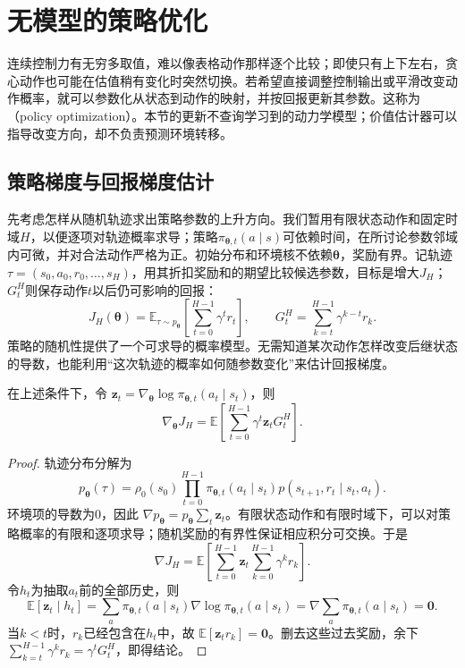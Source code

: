 \section{无模型的策略优化}
\label{sec:rl-learning-policy}

连续控制力有无穷多取值，难以像表格动作那样逐个比较；即使只有上下左右，贪心动作也可能在估值稍有变化时突然切换。若希望直接调整控制输出或平滑改变动作概率，就可以参数化从状态到动作的映射，并按回报更新其参数。这称为（policy optimization）。本节的更新不查询学习到的动力学模型；价值估计器可以指导改变方向，却不负责预测环境转移。

\subsection{策略梯度与回报梯度估计}
\label{sec:rl-learning-policy-gradient}

先考虑怎样从随机轨迹求出策略参数的上升方向。我们暂用有限状态动作和固定时域$H$，以便逐项对轨迹概率求导；策略$\pi_{\bm\theta,t}(a\mid s)$可依赖时间，在所讨论参数邻域内可微，并对合法动作严格为正。初始分布和环境核不依赖$\bm\theta$，奖励有界。记轨迹$\tau=(s_0,a_0,r_0,\ldots,s_H)$，用其折扣奖励和的期望比较候选参数，目标是增大$J_H$；$G_t^H$则保存动作$t$以后仍可影响的回报：
\begin{equation}
  J_H(\bm\theta)=\mathbb E_{\tau\sim p_{\bm\theta}}
      \left[\sum_{t=0}^{H-1}\gamma^t r_t\right],
  \qquad
  G_t^{H}=\sum_{k=t}^{H-1}\gamma^{k-t}r_k .
  \label{eq:rl-learning-finite-policy-objective}
\end{equation}
策略的随机性提供了一个可求导的概率模型。无需知道某次动作怎样改变后继状态的导数，也能利用“这次轨迹的概率如何随参数变化”来估计回报梯度。

\begin{theorem}[有限时域似然比策略梯度]
  \label{thm:rl-learning-likelihood-gradient}
  在上述条件下，令
  $\bm{z}_t=\nabla_{\bm\theta}\log\pi_{\bm\theta,t}(a_t\mid s_t)$，则
  \begin{equation}
    \nabla_{\bm\theta}J_H
       =\mathbb E\left[
          \sum_{t=0}^{H-1}\gamma^t\bm{z}_tG_t^H\right].
    \label{eq:rl-learning-reward-to-go}
  \end{equation}
\end{theorem}
\begin{proof}
  轨迹分布分解为
  \[
    p_{\bm\theta}(\tau)=\rho_0(s_0)
       \prod_{t=0}^{H-1}
       \pi_{\bm\theta,t}(a_t\mid s_t)
       p(s_{t+1},r_t\mid s_t,a_t).
  \]
  环境项的导数为0，因此
  $\nabla p_{\bm\theta}=p_{\bm\theta}\sum_t\bm{z}_t$。有限状态动作和有限时域下，可以对策略概率的有限和逐项求导；随机奖励的有界性保证相应积分可交换。于是
  \[
    \nabla J_H
      =\mathbb E\left[
        \sum_{t=0}^{H-1}\bm{z}_t
        \sum_{k=0}^{H-1}\gamma^k r_k\right].
  \]
  令$h_t$为抽取$a_t$前的全部历史，则
  \[
    \mathbb E[\bm{z}_t\mid h_t]
       =\sum_a\pi_{\bm\theta,t}(a\mid s_t)
          \nabla\log\pi_{\bm\theta,t}(a\mid s_t)
       =\nabla\sum_a\pi_{\bm\theta,t}(a\mid s_t)=\bm0.
  \]
  当$k<t$时，$r_k$已经包含在$h_t$中，故
  $\mathbb E[\bm{z}_t r_k]=\bm0$。删去这些过去奖励，余下
  $\sum_{k=t}^{H-1}\gamma^k r_k=\gamma^tG_t^H$，即得结论。
\end{proof}

